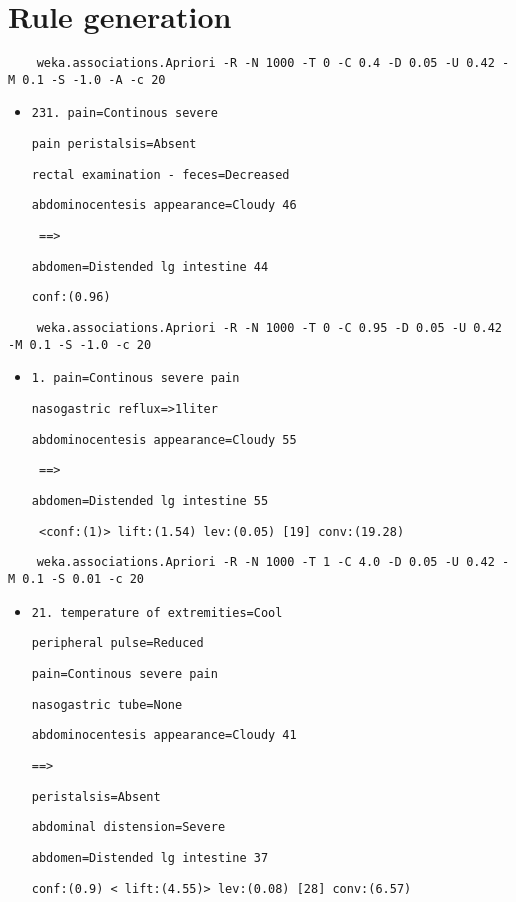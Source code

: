 \section{Rule generation}
\begin{verbatim}
	weka.associations.Apriori -R -N 1000 -T 0 -C 0.4 -D 0.05 -U 0.42 -M 0.1 -S -1.0 -A -c 20
\end{verbatim}
\begin{itemize}
\item \verb|231. pain=Continous severe|

\verb|pain peristalsis=Absent |

\verb|rectal examination - feces=Decreased |

\verb|abdominocentesis appearance=Cloudy 46|
 
\verb| ==> |

\verb|abdomen=Distended lg intestine 44   |

\verb|conf:(0.96)|
\end{itemize}
\begin{verbatim}
	weka.associations.Apriori -R -N 1000 -T 0 -C 0.95 -D 0.05 -U 0.42 -M 0.1 -S -1.0 -c 20
\end{verbatim}
\begin{itemize}
\item \verb|1. pain=Continous severe pain|

\verb|nasogastric reflux=>1liter |

\verb|abdominocentesis appearance=Cloudy 55|

 \verb| ==> |
 
 \verb|abdomen=Distended lg intestine 55 |

 \verb| <conf:(1)> lift:(1.54) lev:(0.05) [19] conv:(19.28)|
\end{itemize}

\begin{verbatim}
	weka.associations.Apriori -R -N 1000 -T 1 -C 4.0 -D 0.05 -U 0.42 -M 0.1 -S 0.01 -c 20
\end{verbatim}

\begin{itemize}
\item  \verb|21. temperature of extremities=Cool|

\verb|peripheral pulse=Reduced |

\verb|pain=Continous severe pain|

\verb|nasogastric tube=None |

\verb|abdominocentesis appearance=Cloudy 41 |

\verb|==> |

\verb|peristalsis=Absent |

\verb|abdominal distension=Severe |

\verb|abdomen=Distended lg intestine 37    |

\verb|conf:(0.9) < lift:(4.55)> lev:(0.08) [28] conv:(6.57)|
\end{itemize}
